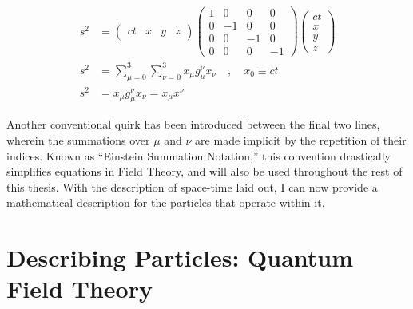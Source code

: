     \begin{equation} \begin{split}
        s^2 &= \begin{pmatrix} ct & x & y & z\end{pmatrix} 
            \begin{pmatrix}
                1 &  0 &  0 &  0 \\
                0 & -1 &  0 &  0 \\
                0 &  0 & -1 &  0 \\
                0 &  0 &  0 & -1
            \end{pmatrix}
            \begin{pmatrix} ct \\ x \\ y \\ z \end{pmatrix} \\
        s^2 &= \sum\limits_{\mu=0}^3 \sum\limits_{\nu=0}^3 x_\mu g_\mu^\nu x_\nu
            \quad , \quad x_0 \equiv ct \\
        s^2 &= x_\mu g_\mu^\nu x_\nu = x_\mu x^\nu
    \end{split} \end{equation}

    Another conventional quirk has been introduced between the final two lines,
        wherein the summations over $\mu$ and $\nu$ are made implicit by the repetition of their indices.
    Known as ``Einstein Summation Notation,'' this convention drastically simplifies equations in Field Theory,
        and will also be used throughout the rest of this thesis.
    With the description of space-time laid out,
        I can now provide a mathematical description for the particles that operate within it.


\section{Describing Particles: Quantum Field Theory}

